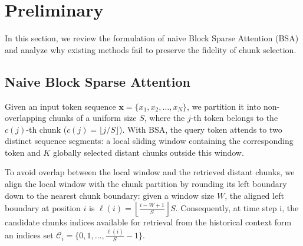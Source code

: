 \section{Preliminary}

In this section, we review the formulation of naive Block Sparse Attention (BSA) and analyze why existing methods fail to preserve the fidelity of chunk selection.

\subsection{Naive Block Sparse Attention}\label{sec:naive_bsa}
Given an input token sequence $\boldsymbol{x} = \{x_1, x_2, \ldots, x_N\}$, we partition it into non-overlapping chunks of a uniform size $S$, where the $j$-th token belongs to the $c(j)$-th chunk ($c(j) = \lfloor j / S \rfloor$). 
With BSA, the query token attends to two distinct sequence segments: a local sliding window containing the corresponding token and $K$ globally selected distant chunks outside this window.

To avoid overlap between the local window and the retrieved distant chunks, we align the local window with the chunk partition by rounding its left boundary down to the nearest chunk boundary: given a window size $W$, the aligned left boundary at position $i$ is $\ell(i)=\left\lfloor \frac{i-W+1}{S} \right\rfloor S$.
Consequently, at time step i, the candidate chunks indices available for retrieval from the historical context form an indices set $\mathcal{C}_i = \{0, 1, \ldots, \frac{\ell(i)}{S}-1\}$. 

